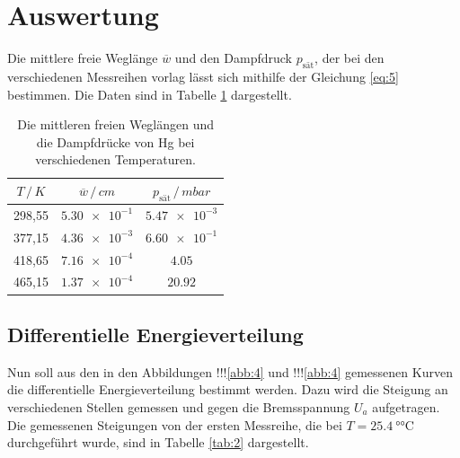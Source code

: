 \section{Auswertung}

Die mittlere freie Weglänge $\overline{w}$ und den Dampfdruck $p_\text{sät}$, der bei den verschiedenen
Messreihen vorlag lässt sich mithilfe der Gleichung \ref{eq:5} bestimmen. Die Daten
sind in Tabelle \ref{tab:1} dargestellt.

\begin{table}
  \centering
  \caption{Die mittleren freien Weglängen und die Dampfdrücke von Hg bei verschiedenen
  Temperaturen.}
  \label{tab:1}
  \begin{tabular}{c c c}
    \toprule
    $T \, / \, K$ & $\overline{w} \, / \, cm$ & $p_\text{sät} \, / \, mbar$ \\
    \midrule
    298,55 & $\num{5.30e-1}$ & $\num{5.47e-3}$ \\
    377,15 & $\num{4.36e-3}$ & $\num{6.60e-1}$ \\
    418,65 & $\num{7.16e-4}$ & $\num{4.05}$    \\
    465,15 & $\num{1.37e-4}$ & $\num{20.92}$ \\
    \bottomrule
  \end{tabular}
\end{table}

\subsection{Differentielle Energieverteilung}

Nun soll aus den in den Abbildungen !!!\ref{abb:4} und !!!\ref{abb:4} gemessenen Kurven
die differentielle Energieverteilung bestimmt werden. Dazu wird die Steigung
an verschiedenen Stellen gemessen und gegen die Bremsspannung $U_a$ aufgetragen.
Die gemessenen Steigungen von der ersten Messreihe, die bei $T = \SI{25.4}{\degree\celsius}$
durchgeführt wurde, sind in Tabelle \ref{tab:2} dargestellt.

